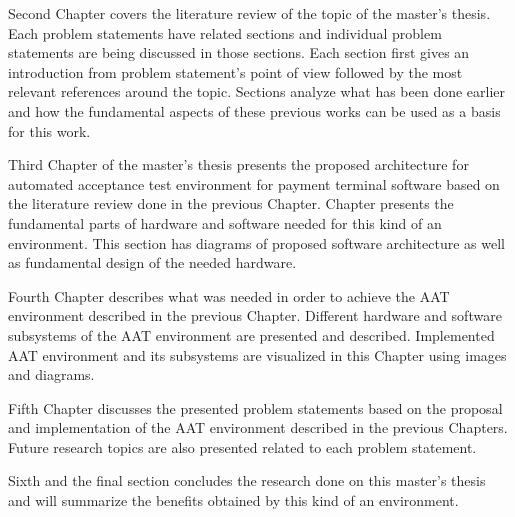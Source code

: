 Second Chapter covers the literature review of the topic of the master's thesis. Each problem statements have related sections and individual problem statements are being discussed in those sections. Each section first gives an introduction from problem statement's point of view followed by the most relevant references around the topic. Sections analyze what has been done earlier and how the fundamental aspects of these previous works can be used as a basis for this work.

Third Chapter of the master's thesis presents the proposed architecture for automated acceptance test environment for payment terminal software based on the literature review done in the previous Chapter. Chapter presents the fundamental parts of hardware and software needed for this kind of an environment. This section has diagrams of proposed software architecture as well as fundamental design of the needed hardware.

Fourth Chapter describes what was needed in order to achieve the AAT environment described in the previous Chapter. Different hardware and software subsystems of the AAT environment are presented and described. Implemented AAT environment and its subsystems are visualized in this Chapter using images and diagrams.

Fifth Chapter discusses the presented problem statements based on the proposal and implementation of the AAT environment described in the previous Chapters. Future research topics are also presented related to each problem statement. 

Sixth and the final section concludes the research done on this master's thesis and will summarize the benefits obtained by this kind of an environment.

